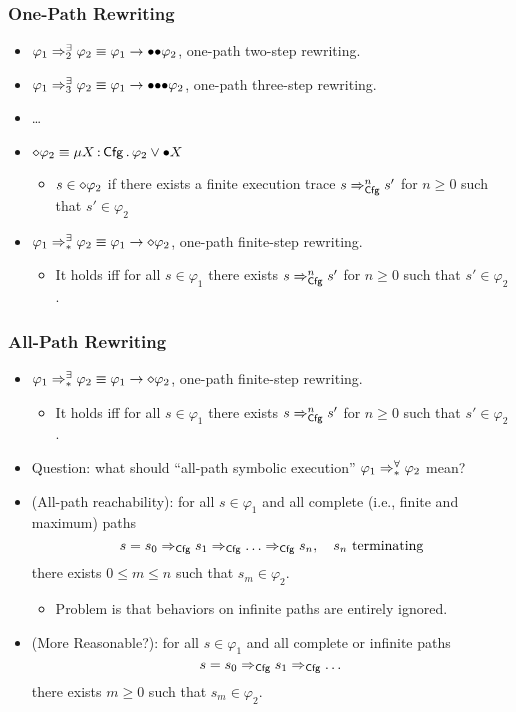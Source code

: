 \documentclass{beamer}
\begin{document}
\begin{frame}
\frametitle{One-Path Rewriting}
\begin{itemize}
\item $\varphi_1 \Rightarrow^{\exists}_2 \varphi_2 \equiv 
       \varphi_1 \rightarrow \mathord{\bullet} \mathord{\bullet} \varphi_2$,
one-path two-step rewriting.
\item $\varphi_1 \Rightarrow^{\exists}_3 \varphi_2 \equiv 
       \varphi_1 \rightarrow \mathord{\bullet}\mathord{\bullet} \mathord{\bullet} \varphi_2$,
one-path three-step rewriting.
\item \dots
\item $\diamond \varphi_2 \equiv \mu X \,{:}\, \mathsf{Cfg} \,.\, \varphi_2 \lor \mathord{\bullet} X$
\begin{itemize}
\item $s \in \diamond\varphi_2$ if
      there exists a finite execution trace
      $s \Rightarrow_{\mathsf{Cfg}}^n s'$ for $n \ge 0$ such that
      $s' \in \varphi_2$
\end{itemize}
\item $\varphi_1 \Rightarrow^{\exists}_{*} \varphi_2 \equiv
       \varphi_1 \rightarrow \diamond\varphi_2$, one-path finite-step rewriting.
\begin{itemize}
\item It holds iff for all $s \in \varphi_1$
      there exists $s \Rightarrow_{\mathsf{Cfg}}^n s'$ for $n \ge 0$ such that
      $s' \in \varphi_2$.
\end{itemize}
\end{itemize}
\end{frame}

\begin{frame}
\frametitle{All-Path Rewriting}
\begin{itemize}
\item $\varphi_1 \Rightarrow^{\exists}_{*} \varphi_2 \equiv
       \varphi_1 \rightarrow \diamond\varphi_2$, one-path finite-step rewriting.
\begin{itemize}
\item It holds iff for all $s \in \varphi_1$
      there exists $s \Rightarrow_{\mathsf{Cfg}}^n s'$ for $n \ge 0$ such that
      $s' \in \varphi_2$.
\end{itemize}
\item Question: what should ``all-path symbolic execution''
      $\varphi_1 \Rightarrow^{\forall}_{*} \varphi_2$ mean? 
\item (All-path reachability):
      for all $s \in \varphi_1$ and all complete 
      (i.e., finite and maximum) paths
      \[s = s_0 \To_\Cfg s_1 \To_\Cfg \dots \To_\Cfg s_n,\quad
       \text{$s_n$ terminating} \]
      there exists $0 \le m \le n$ such that $s_m \in \varphi_2$.
\begin{itemize}
\item Problem is that behaviors on infinite paths are entirely ignored. 
\end{itemize}
\item (More Reasonable?):
      for all $s \in \varphi_1$ and all complete or infinite
      paths
      \[s = s_0 \Rightarrow_{\mathsf{Cfg}} s_1 \Rightarrow_{\mathsf{Cfg}} \dots\]
      there exists $m \ge 0$ such that $s_m \in \varphi_2$.
\end{itemize}
\end{frame}
\end{document}
